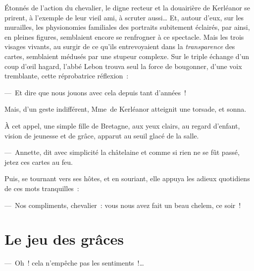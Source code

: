 \documentclass[french,twoside]{book} %
\newcommand{\salute}[1]{\bigbreak{#1}\par\medbreak}
\begin{document}
Étonnés de l’action du chevalier, le digne   recteur et la douairière de Kerléanor se prirent, à l’exemple de leur vieil ami, à scruter aussi… Et, autour d’eux, sur les murailles, les physionomies familiales des portraits subitement éclairés, par ainsi, en pleines figures, semblaient encore se renfrogner à ce spectacle. Mais les trois visages vivants, au surgir de ce qu’ils entrevoyaient dans la \emph{transparence} des cartes, semblaient médusés par une stupeur complexe. Sur le triple échange d’un coup d’œil hagard, l’abbé Lebon trouva seul la force de bougonner, d’une voix tremblante, cette réprobatrice réflexion :\par
— Et dire que nous jouons avec cela depuis tant d’années !\par
Mais, d’un geste indifférent, Mme de Kerléanor atteignit une torsade, et sonna.\par
À cet appel, une simple fille de Bretagne, aux yeux clairs, au regard d’enfant, vision de jeunesse et de grâce, apparut au seuil glacé de la salle.\par
— Annette, dit avec simplicité la châtelaine et comme si rien ne se fût passé, jetez ces cartes au feu.\par
   Puis, se tournant vers ses hôtes, et en souriant, elle appuya les adieux quotidiens de ces mots tranquilles :\par
— Nos compliments, chevalier : vous nous avez fait un beau chelem, ce soir !
 \section[{Le jeu des grâces}]{Le jeu des grâces}\renewcommand{\leftmark}{Le jeu des grâces}


\salute{À Monsieur Victor Wilder}
\noindent — Oh ! cela n’empêche pas les sentiments !…\par
\end{document}

